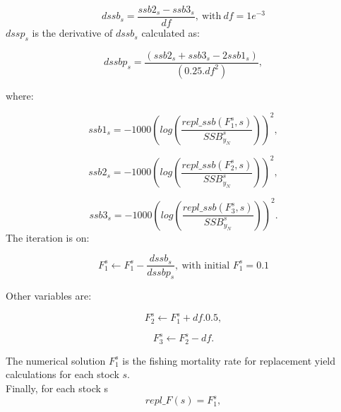 \documentclass{article}
\begin{document}
\begin{equation}
    dssb_{s} = \dfrac{ssb2_{s} - ssb3_{s}}{df}, \ \text{with} \  df=1e^{-3}
\end{equation}
 $dssp_{s}$ is the derivative of $dssb_{s}$ calculated as:

\begin{equation}
    dssbp_{s}  = \dfrac{(ssb2_{s} + ssb3_{s} - 2 ssb1_{s})}{(0.25. df^2)},
\end{equation}

where:

\begin{equation}
    ssb1_{s}=-1000 \left(log\left(\dfrac{repl\_ssb(F_1^s,s)}{SSB^s_{y_N}}\right)\right)^2,
\end{equation}

\begin{equation}
    ssb2_{s}=-1000 \left(log\left(\dfrac{repl\_ssb(F_2^s,s)}{SSB^s_{y_N}}\right)\right)^2,
\end{equation}

\begin{equation}
    ssb3_{s}=-1000 \left(log\left(\dfrac{repl\_ssb(F_3^s,s)}{SSB^s_{y_N}}\right)\right)^2.
\end{equation}
The iteration is on:

\begin{equation}
    F_{1}^s\leftarrow F_{1}^s-\dfrac{dssb_{s}}{dssbp_{s}}, \ \text{with initial $F_{1}^s=0.1$}
\end{equation}

Other variables are:

\begin{equation}
    F_2^s \leftarrow F_1^s+df.0.5,
\end{equation}

\begin{equation}
    F_3^s \leftarrow F_2^s -df.
\end{equation}



The numerical solution $F_1^s$ is the fishing mortality rate for replacement yield calculations for each stock $s$.\\

Finally, for each stock s 
\begin{equation}
    repl\_F(s) = F_1^s,
\end{equation}
\end{document}
